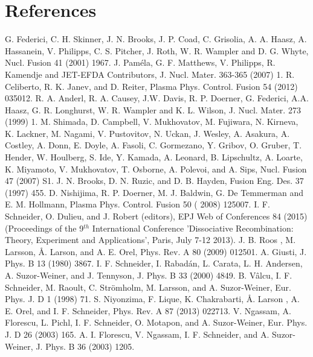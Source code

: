 \documentclass[reviewcopy]{elsarticle}
\begin{document}
\section*{References}
\begin{thebibliography}{999}
 G. Federici, C. H. Skinner, J. N. Brooks, J. P. Coad, C. Grisolia, A. A. Haasz, A. Hassanein, V. Philipps, C. S. Pitcher, J. Roth, W. R. Wampler and D. G. Whyte, Nucl. Fusion 41 (2001) 1967. 
 J. Pam\'ela, G. F. Matthews, V. Philipps, R. Kamendje and JET-EFDA Contributors, J. Nucl. Mater. 363-365 (2007) 1.
 R. Celiberto, R. K. Janev, and D. Reiter, Plasma Phys. Control. Fusion 54 (2012) 035012.
 R. A. Anderl, R. A. Causey, J.W. Davis, R. P. Doerner, G. Federici, A.A. Haasz, G. R. Longhurst, W. R. Wampler and K. L. Wilson, J. Nucl. Mater. 273 (1999) 1.
 M. Shimada, D. Campbell, V. Mukhovatov, M. Fujiwara, N. Kirneva, K. Lackner, M. Nagami, V. Pustovitov, N. Uckan, J. Wesley, A. Asakura, A. Costley, A. Donn, E. Doyle, A. Fasoli, C. Gormezano, Y. Gribov, O. Gruber, T. Hender, W. Houlberg, S. Ide, Y. Kamada, A. Leonard, B. Lipschultz, A. Loarte, K. Miyamoto, V. Mukhovatov, T. Osborne, A. Polevoi, and A. Sips, Nucl. Fusion 47 (2007) S1.
 J. N. Brooks, D. N. Ruzic, and D. B. Hayden, Fusion Eng. Des. 37 (1997) 455.
 D. Nishijima, R. P. Doerner, M. J. Baldwin, G. De Temmerman and E. M. Hollmann, Plasma Phys. Control. Fusion 50 ( 2008) 125007.
 I. F. Schneider, O. Dulieu, and J. Robert (editors), EPJ Web of Conferences 84 (2015) (Proceedings of the 9$^{th}$ International Conference 'Dissociative Recombination: Theory, Experiment and Applications', Paris, July 7-12 2013).
 J. B. Roos , M. Larsson, \AA. Larson, and A. E. Orel, Phys. Rev. A 80 (2009) 012501.
 A. Giusti, J. Phys. B 13 (1980) 3867.
 I. F. Schneider, I. Rabad\'an, L. Carata, L. H. Andersen, A. Suzor-Weiner, and J. Tennyson, J. Phys. B 33 (2000) 4849.
 B. V\^alcu, I. F. Schneider, M. Raoult, C. Str\"omholm, M. Larsson, and A. Suzor-Weiner,  Eur. Phys. J. D 1 (1998) 71.
 S. Niyonzima, F. Lique, K. Chakrabarti, \AA. Larson , A. E. Orel, and I. F. Schneider, Phys. Rev. A 87 (2013) 022713.
 V. Ngassam, A. Florescu, L. Pichl, I. F. Schneider, O. Motapon, and A. Suzor-Weiner, Eur. Phys. J. D 26 (2003) 165.
 A. I. Florescu, V. Ngassam, I. F. Schneider, and A. Suzor-Weiner, J. Phys. B 36 (2003) 1205.

\end{thebibliography}
\end{document}

